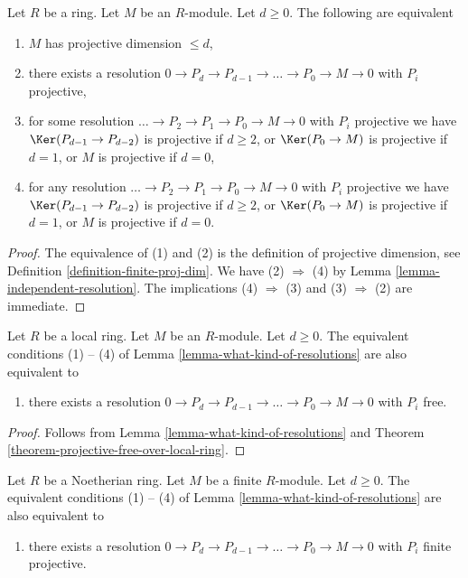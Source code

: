 \begin{lemma}
\label{lemma-what-kind-of-resolutions}
Let $R$ be a ring. Let $M$ be an $R$-module. Let $d \geq 0$.
The following are equivalent
\begin{enumerate}
\item $M$ has projective dimension $\leq d$,
\item there exists a resolution
$0 \to P_d \to P_{d - 1} \to \ldots \to P_0 \to M \to 0$
with $P_i$ projective,
\item for some resolution
$\ldots \to P_2 \to P_1 \to P_0 \to M \to 0$ with
$P_i$ projective we have $\Ker(P_{d - 1} \to P_{d - 2})$
is projective if $d \geq 2$, or $\Ker(P_0 \to M)$ is projective if
$d = 1$, or $M$ is projective if $d = 0$,
\item for any resolution
$\ldots \to P_2 \to P_1 \to P_0 \to M \to 0$ with
$P_i$ projective we have $\Ker(P_{d - 1} \to P_{d - 2})$
is projective if $d \geq 2$, or $\Ker(P_0 \to M)$ is projective if
$d = 1$, or $M$ is projective if $d = 0$.
\end{enumerate}
\end{lemma}

\begin{proof}
The equivalence of (1) and (2) is the definition of projective
dimension, see Definition \ref{definition-finite-proj-dim}.
We have (2) $\Rightarrow$ (4) by Lemma \ref{lemma-independent-resolution}.
The implications (4) $\Rightarrow$ (3) and (3) $\Rightarrow$ (2) are
immediate.
\end{proof}

\begin{lemma}
\label{lemma-what-kind-of-resolutions-local}
Let $R$ be a local ring. Let $M$ be an $R$-module. Let $d \geq 0$.
The equivalent conditions (1) -- (4) of
Lemma \ref{lemma-what-kind-of-resolutions}
are also equivalent to
\begin{enumerate}
\item[(5)] there exists a resolution
$0 \to P_d \to P_{d - 1} \to \ldots \to P_0 \to M \to 0$
with $P_i$ free.
\end{enumerate}
\end{lemma}

\begin{proof}
Follows from Lemma \ref{lemma-what-kind-of-resolutions} and
Theorem \ref{theorem-projective-free-over-local-ring}.
\end{proof}

\begin{lemma}
\label{lemma-what-kind-of-resolutions-Noetherian}
Let $R$ be a Noetherian ring. Let $M$ be a finite $R$-module.
Let $d \geq 0$. The equivalent conditions (1) -- (4) of
Lemma \ref{lemma-what-kind-of-resolutions}
are also equivalent to
\begin{enumerate}
\item[(6)] there exists a resolution
$0 \to P_d \to P_{d - 1} \to \ldots \to P_0 \to M \to 0$
with $P_i$ finite projective.
\end{enumerate}
\end{lemma}

